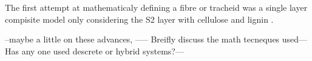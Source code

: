  The first attempt at mathematicaly defining a fibre or tracheid was a single layer compisite model only considering the S2 layer with cellulose and lignin \cite{Barber_1964}.  
 
 
 --maybe a little on these advances, ----- Breifly discuss the math
tecneques used---Has any one used descrete or hybrid systems?---
